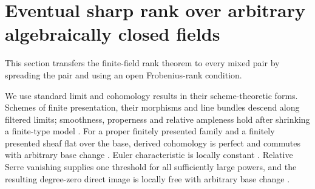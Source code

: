 \section{Eventual sharp rank over arbitrary algebraically closed fields}
\label{sec:spreading}

This section transfers the finite-field rank theorem to every mixed pair by spreading the pair and using an open Frobenius-rank condition.

We use standard limit and cohomology results in their scheme-theoretic forms. Schemes of finite presentation, their morphisms and line bundles descend along filtered limits; smoothness, properness and relative ampleness hold after shrinking a finite-type model \citep[Tags~01ZM, 0B8W, 0C0C, 081F and 09MT]{Stacks}. For a proper finitely presented family and a finitely presented sheaf flat over the base, derived cohomology is perfect and commutes with arbitrary base change \citep[Tag~0B91]{Stacks}. Euler characteristic is locally constant \citep[Tag~0B9T]{Stacks}. Relative Serre vanishing supplies one threshold for all sufficiently large powers, and the resulting degree-zero direct image is locally free with arbitrary base change \citep[Tags~02O1 and 0D4E]{Stacks}.

